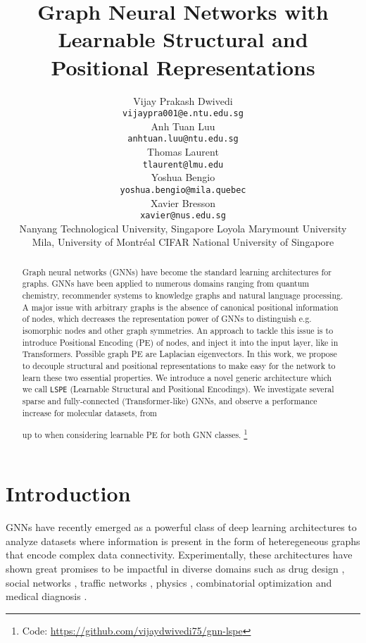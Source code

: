 \documentclass{article} \usepackage{iclr2021_conference,times}
\title{Graph Neural Networks with Learnable Structural and Positional Representations}
\author{Vijay Prakash Dwivedi \\
  \texttt{vijaypra001@e.ntu.edu.sg} \\
  \And
  Anh Tuan Luu \\
  \texttt{anhtuan.luu@ntu.edu.sg} \\
  \And
  Thomas Laurent \\
  \texttt{tlaurent@lmu.edu} \\
  \And
  Yoshua Bengio \\
  \texttt{yoshua.bengio@mila.quebec} \\
  \And
  Xavier Bresson \\
  \texttt{xavier@nus.edu.sg} \\
  \AND
  {\normalfont  Nanyang Technological University, Singapore \hspace{0.18cm}  Loyola Marymount University} \\
   Mila, University of Montr\'eal \hspace{0.18cm}  CIFAR \hspace{0.14cm}  National University of Singapore
}
\begin{document}
\maketitle



\begin{abstract}
Graph neural networks (GNNs) have become the standard learning architectures for graphs.
GNNs have been applied to numerous domains ranging from quantum chemistry, recommender systems to knowledge graphs and natural language processing. A major issue with arbitrary graphs is the absence of canonical positional information of nodes, which decreases the representation power of GNNs to distinguish e.g. isomorphic nodes and other graph symmetries. An approach to tackle this issue is to introduce Positional Encoding (PE) of nodes, and inject it into the input layer, like in Transformers. Possible graph PE are Laplacian eigenvectors. In this work, we propose to decouple structural and positional representations to make easy for the network to learn these two essential properties. We introduce a novel generic architecture which we call \texttt{LSPE} (Learnable Structural and Positional Encodings). We investigate several sparse and fully-connected (Transformer-like) GNNs, and observe a performance increase for molecular datasets, from 

up to 
when considering learnable PE for both GNN classes.
\footnote{Code:  \url{https://github.com/vijaydwivedi75/gnn-lspe}}
\end{abstract}

\section{Introduction}
\label{sec:introduction}

GNNs have recently emerged as a powerful class of deep learning architectures to analyze datasets where information is present in the form of heteregeneous graphs that encode complex data connectivity. Experimentally, these architectures have 
shown great promises to be impactful in diverse domains such as drug design \citep{stokes2020deep, gaudelet2020utilising}, social networks \citep{monti2019fake, pal2020pinnersage}, traffic networks \citep{derrowpinion2021traffic}, physics \citep{cranmer2019learning, bapst2020unveiling}, combinatorial optimization \citep{bengio2021machine,cappart2021combinatorial} and medical diagnosis \citep{li2020graph}. 
\end{document}
